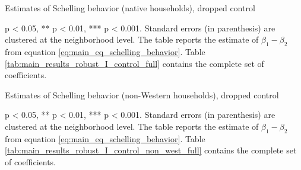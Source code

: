 \documentclass[../main.tex]{subfiles}
\begin{document}
\begin{table}[H]
    \centering
    \caption{Estimates of Schelling behavior (native households), dropped control}
    \label{tab:main_results_non_west_I_control}
    \begin{threeparttable}
            
    \begin{tablenotes}[flushleft]
    \item \scriptsize * p < 0.05, ** p < 0.01, *** p < 0.001. Standard errors (in parenthesis) are clustered at the neighborhood level. The table reports the estimate of $\beta_1 - \beta_2$ from equation \ref{eq:main_eq_schelling_behavior}. Table \ref{tab:main_results_robust_I_control_full} contains the complete set of coefficients. 
    \end{tablenotes}
    \end{threeparttable}
\end{table}


\begin{table}[H]
    \centering
    \caption{Estimates of Schelling behavior (non-Western households), dropped control}
    \label{tab:main_results_non_west_I_control_non_west}
    \begin{threeparttable}
            
    \begin{tablenotes}[flushleft]
    \item \scriptsize * p < 0.05, ** p < 0.01, *** p < 0.001. Standard errors (in parenthesis) are clustered at the neighborhood level. The table reports the estimate of $\beta_1 - \beta_2$ from equation \ref{eq:main_eq_schelling_behavior}. Table \ref{tab:main_results_robust_I_control_non_west_full} contains the complete set of coefficients. 
    \end{tablenotes}
    \end{threeparttable}
\end{table}
\end{document}
